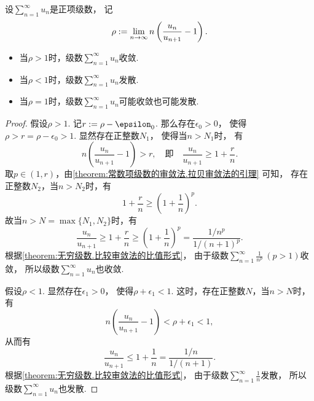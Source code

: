 \begin{theorem}[拉贝审敛法]
设\(\sum_{n=1}^\infty u_n\)是正项级数，
记\[
	\rho := \lim_{n\to\infty} n \left(\frac{u_n}{u_{n+1}} - 1\right).
\]
\begin{itemize}
	\item 当\(\rho>1\)时，级数\(\sum_{n=1}^\infty u_n\)收敛.
	\item 当\(\rho<1\)时，级数\(\sum_{n=1}^\infty u_n\)发散.
	\item 当\(\rho=1\)时，级数\(\sum_{n=1}^\infty u_n\)可能收敛也可能发散.
\end{itemize}
\begin{proof}
假设\(\rho>1\).
记\(r \defeq \rho-\epsilon_0\).
那么存在\(\epsilon_0>0\)，
使得\(\rho>r=\rho-\epsilon_0>1\).
显然存在正整数\(N_1\)，
使得当\(n>N_1\)时，
有\[
	n \left(\frac{u_n}{u_{n+1}}-1\right) > r,
	\quad\text{即}\quad
	\frac{u_n}{u_{n+1}} \geq 1+\frac{r}{n}.
\]
取\(p\in(1,r)\)，由\cref{theorem:常数项级数的审敛法.拉贝审敛法的引理} 可知，
存在正整数\(N_2\)，当\(n>N_2\)时，有\[
	1+\frac{r}{n} \geq \left(1+\frac1n\right)^p.
\]
故当\(n>N=\max\{N_1,N_2\}\)时，有\[
	\frac{u_n}{u_{n+1}}
	\geq 1+\frac{r}{n}
	\geq \left(1+\frac1n\right)^p
	= \frac{1/n^p}{1/(n+1)^p}.
\]
根据\cref{theorem:无穷级数.比较审敛法的比值形式}，
由于级数\(\sum_{n=1}^\infty \frac1{n^p}\ (p>1)\)收敛，
所以级数\(\sum_{n=1}^\infty u_n\)也收敛.

假设\(\rho<1\).
显然存在\(\epsilon_1>0\)，
使得\(\rho+\epsilon_1<1\).
这时，存在正整数\(N\)，当\(n>N\)时，有\[
	n \left(\frac{u_n}{u_{n+1}}-1\right)
	< \rho+\epsilon_1
	< 1,
\]
从而有\[
	\frac{u_n}{u_{n+1}}
	\leq 1+\frac1n
	= \frac{1/n}{1/(n+1)}.
\]
根据\cref{theorem:无穷级数.比较审敛法的比值形式}，
由于级数\(\sum_{n=1}^\infty \frac1n\)发散，
所以级数\(\sum_{n=1}^\infty u_n\)也发散.
\end{proof}
\end{theorem}

